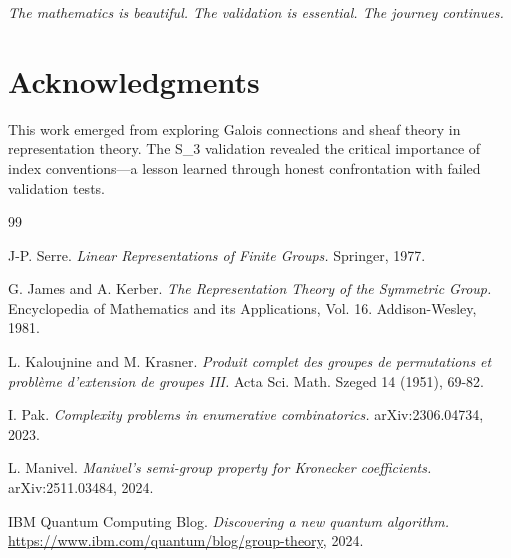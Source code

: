 \documentclass[11pt]{article}
\theoremstyle{definition}
\theoremstyle{remark}
\begin{document}
\vspace{0.5cm}

\textit{The mathematics is beautiful. The validation is essential. The journey continues.}

\section*{Acknowledgments}

This work emerged from exploring Galois connections and sheaf theory in representation theory. The S_3 validation revealed the critical importance of index conventions—a lesson learned through honest confrontation with failed validation tests.

\begin{thebibliography}{99}

J-P. Serre.
\textit{Linear Representations of Finite Groups.}
Springer, 1977.

G. James and A. Kerber.
\textit{The Representation Theory of the Symmetric Group.}
Encyclopedia of Mathematics and its Applications, Vol. 16. Addison-Wesley, 1981.

L. Kaloujnine and M. Krasner.
\textit{Produit complet des groupes de permutations et probl\`eme d'extension de groupes III.}
Acta Sci. Math. Szeged 14 (1951), 69-82.

I. Pak.
\textit{Complexity problems in enumerative combinatorics.}
arXiv:2306.04734, 2023.

L. Manivel.
\textit{Manivel's semi-group property for Kronecker coefficients.}
arXiv:2511.03484, 2024.

IBM Quantum Computing Blog.
\textit{Discovering a new quantum algorithm.}
\url{https://www.ibm.com/quantum/blog/group-theory}, 2024.

\end{thebibliography}
\end{document}
